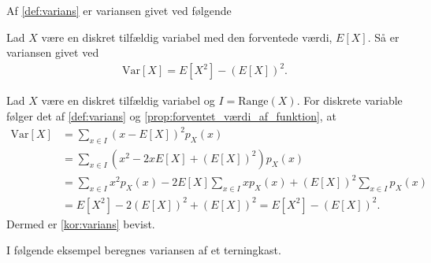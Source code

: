 
Af \autoref{def:varians} er variansen givet ved følgende

\begin{minipage}\textwidth
\begin{kor} \textbf{}\label{kor:varians} %
\newline
Lad $X$ være en diskret tilfældig variabel med den forventede værdi, $E[X]$. Så er variansen givet ved
\begin{align*}
    \text{Var}[X]=E[X^2] - \left(E[X]\right)^2.
\end{align*}
\end{kor}
\end{minipage}

\begin{bev} \textbf{} %
\newline
Lad $X$ være en diskret tilfældig variabel og $I=\text{Range}(X)$. For diskrete variable følger det af  \autoref{def:varians} og \autoref{prop:forventet_værdi_af_funktion}, at
\begin{align*}
    \text{Var}[X] &=\sum_{x\in I}\left(x-E[X]\right)^2 p_X(x)\\
    &= \sum_{x\in I} \left(x^2-2xE[X]+\left(E[X]\right)^2\right)p_X(x)\\
    &= \sum_{x\in I} x^2p_X(x) - 2E[X] \sum_{x\in I} x p_X(x) + \left(E[X]\right)^2 \sum_{x\in I} p_X(x)\\
    &= E[X^2]-2\left(E[X]\right)^2+\left(E[X]\right)^2
    = E[X^2] - \left(E[X]\right)^2.
\end{align*}
Dermed er \autoref{kor:varians} bevist.
\end{bev}
I følgende eksempel beregnes variansen af et terningkast. 

